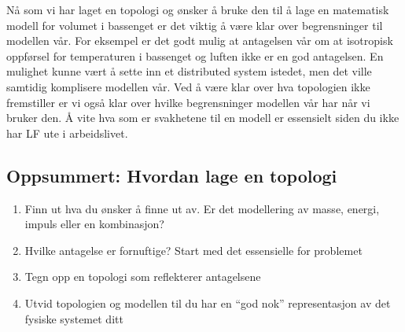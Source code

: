 Nå som vi har laget en topologi og ønsker å bruke den til å lage en matematisk modell for volumet i bassenget er det viktig å være klar over begrensninger til modellen vår. For eksempel er det godt mulig at antagelsen vår om at isotropisk oppførsel for temperaturen i bassenget og luften ikke er en god antagelsen. En mulighet kunne vært å sette inn et distributed system istedet, men det ville samtidig komplisere modellen vår. Ved å være klar over hva topologien ikke fremstiller er vi også klar over hvilke begrensninger modellen vår har når vi bruker den. Å vite hva som er svakhetene til en modell er essensielt siden du ikke har LF ute i arbeidslivet. 

\subsection{Oppsummert: Hvordan lage en topologi}
\begin{enumerate}
    \item Finn ut hva du ønsker å finne ut av. Er det modellering av masse, energi, impuls eller en kombinasjon?
    \item Hvilke antagelse er fornuftige? Start med det essensielle for problemet
    \item Tegn opp en topologi som reflekterer antagelsene
    \item Utvid topologien og modellen til du har en \enquote{god nok} representasjon av det fysiske systemet ditt
\end{enumerate}

\clearpage